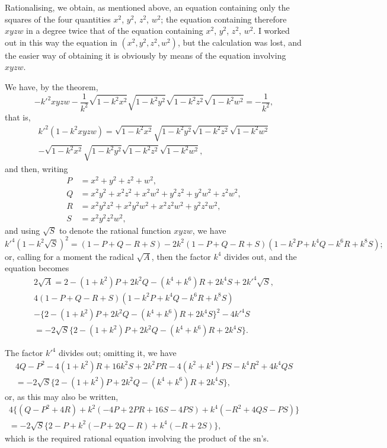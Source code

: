 \documentclass[11pt,a4paper]{book}
\providecommand{\sn}{\mathrm{sn}}
\begin{document}
Rationalising, we obtain, as mentioned above, an equation containing only the squares
of the four quantities $x^2$, $y^2$, $z^2$, $w^2$; the equation containing therefore
$xyzw$ in a degree twice that of the equation containing $x^2$, $y^2$, $z^2$, $w^2$.
I worked out in this way the equation in $(x^2, y^2, z^2, w^2)$, but the calculation
was lost, and the easier way of obtaining it is obviously by means of the equation
involving $xyzw$.

We have, by the theorem,
\[
-k'^2 xyzw - \frac{1}{k^2}\sqrt{1-k^2x^2}\sqrt{1-k^2y^2}\sqrt{1-k^2z^2}\sqrt{1-k^2w^2}
= -\frac{1}{k^2},
\]
that is,
\begin{multline*}
k'^2(1-k^2xyzw) = \sqrt{1-k^2x^2}\sqrt{1-k^2y^2}\sqrt{1-k^2z^2}\sqrt{1-k^2w^2} \\
- \sqrt{1-k^2x^2}\sqrt{1-k^2y^2}\sqrt{1-k^2z^2}\sqrt{1-k^2w^2},
\end{multline*}
and then, writing
\begin{align*}
P &= x^2+y^2+z^2+w^2,\\
Q &= x^2y^2+x^2z^2+x^2w^2+y^2z^2+y^2w^2+z^2w^2,\\
R &= x^2y^2z^2+x^2y^2w^2+x^2z^2w^2+y^2z^2w^2,\\
S &= x^2y^2z^2w^2,
\end{align*}
and using $\sqrt{S}$ to denote the rational function $xyzw$, we have
\[
k'^4(1-k^2\sqrt{S})^2 = (1-P+Q-R+S)
-2k^2(1-P+Q-R+S)(1-k^2P+k^4Q-k^6R+k^8S);
\]
or, calling for a moment the radical $\sqrt{A}$, then the factor $k^4$ divides out, and
the equation becomes
\begin{multline*}
2\sqrt{A} = 2-(1+k^2)P+2k^2Q-(k^4+k^6)R+2k^4S+2k'^4\sqrt{S},\\
4(1-P+Q-R+S)(1-k^2P+k^4Q-k^6R+k^8S) \\
- \{2-(1+k^2)P+2k^2Q-(k^4+k^6)R+2k^4S\}^2 - 4k'^4S\\
= -2\sqrt{S}\{2-(1+k^2)P+2k^2Q-(k^4+k^6)R+2k^4S\}.
\end{multline*}

The factor $k'^4$ divides out; omitting it, we have
\begin{multline*}
4Q-P^2-4(1+k^2)R+16k^2S+2k^2PR-4(k^2+k^4)PS-k^4R^2+4k^4QS\\
= -2\sqrt{S}\{2-(1+k^2)P+2k^2Q-(k^4+k^6)R+2k^4S\},
\end{multline*}
or, as this may also be written,
\begin{multline*}
4\{(Q-P^2+4R)+k^2(-4P+2PR+16S-4PS)+k^4(-R^2+4QS-PS)\}\\
= -2\sqrt{S}\{2-P+k^2(-P+2Q-R)+k^4(-R+2S)\},
\end{multline*}
which is the required rational equation involving the product of the $\sn$'s.
\end{document}
